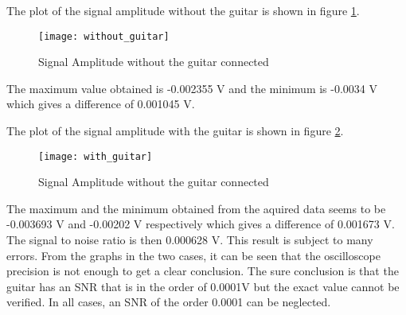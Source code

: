 The plot of the signal amplitude without the guitar is shown in figure \ref{fig:without_guitar}. 

\begin{figure}[hbt]
  \centering
  \texttt{[image: without\_guitar]}
  \caption{Signal Amplitude without the guitar connected}
  \label{fig:without_guitar}
\end{figure}

The maximum value obtained is -0.002355 V and the minimum is -0.0034 V which gives a difference of 0.001045 V. 

The plot of the signal amplitude with the guitar is shown in figure \ref{fig:with_guitar}. 

\begin{figure}[hbt]
  \centering
  \texttt{[image: with\_guitar]}
  \caption{Signal Amplitude without the guitar connected}
  \label{fig:with_guitar}
\end{figure}

The maximum and the minimum obtained from the aquired data seems to be -0.003693 V and -0.00202 V respectively which gives a difference of 0.001673 V. 
The signal to noise ratio is then 0.000628 V. 
This result is subject to many errors. From the graphs in the two cases, it can be seen that the oscilloscope precision is not enough to get a clear conclusion. The sure conclusion is that the guitar has an SNR that is in the order of 0.0001V but the exact value cannot be verified. In all cases, an SNR of the order 0.0001 can be neglected. 
